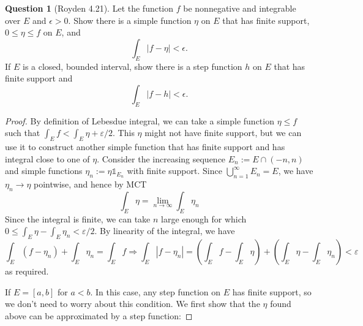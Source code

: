 \documentclass{article}
\newcommand{\longimplies}{\Longrightarrow}
\theoremstyle{definition} %
\numberwithin{thm}{section} %
\theoremstyle{definition} %
\newtheorem{question}[thm]{Question}
\begin{document}
\begin{question}[Royden 4.21]
Let the function $f$ be nonnegative and integrable over $E$ and $\epsilon > 0$. Show there is a simple function $\eta$ on $E$ that has finite support, $0 \leq \eta \leq f$ on $E$, and 
\[ \int_E |f - \eta| < \epsilon. \]
If $E$ is a closed, bounded interval, show there is a step function $h$ on $E$ that has finite support and 
\[ \int_E |f - h| < \epsilon. \]
\end{question}
\begin{proof}
By definition of Lebesdue integral, we can take a simple function $\eta \leq f$ such that $\int_E f < \int_E \eta + \varepsilon/2$. This $\eta$ might not have finite support, but we can use it to construct another simple function that has finite support and has integral close to one of $\eta$. Consider the increasing sequence $E_n := E \cap (-n, n)$ and simple functions $\eta_n := \eta\mathds{1}_{E_n}$ with finite support. Since $\bigcup_{n = 1}^\infty E_n = E$, we have $\eta_n \to \eta$ pointwise, and hence by MCT
\[ \int_E \eta = \lim_{n \to \infty} \int_E \eta_n \]
Since the integral is finite, we can take $n$ large enough for which $0 \leq \int_E \eta - \int_E \eta_n < \varepsilon / 2$. By linearity of the integral, we have 
\[ \int_E (f - \eta_n) + \int_E \eta_n = \int_E f \longimplies \int_E |f - \eta_n| = \left(\int_E f - \int_E \eta\right) + \left(\int_E \eta - \int_E \eta_n\right) < \varepsilon \]
as required. 

If $E = [a, b]$ for $a < b$. In this case, any step function on $E$ has finite support, so we don't need to worry about this condition. We first show that the $\eta$ found above can be approximated by a step function:


\end{proof}
\end{document}
